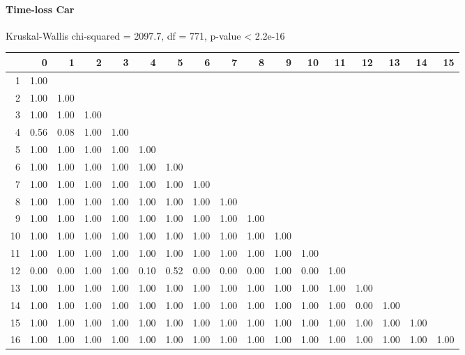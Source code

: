 \paragraph{Time-loss Car}
Kruskal-Wallis chi-squared = 2097.7, df = 771, p-value < 2.2e-16

% 
\begin{tabular}{rrrrrrrrrrrrrrrrr}
  \hline
 & 0 & 1 & 2 & 3 & 4 & 5 & 6 & 7 & 8 & 9 & 10 & 11 & 12 & 13 & 14 & 15 \\ 
  \hline
1 & 1.00 &  &  &  &  &  &  &  &  &  &  &  &  &  &  &  \\ 
  2 & 1.00 & 1.00 &  &  &  &  &  &  &  &  &  &  &  &  &  &  \\ 
  3 & 1.00 & 1.00 & 1.00 &  &  &  &  &  &  &  &  &  &  &  &  &  \\ 
  4 & 0.56 & 0.08 & 1.00 & 1.00 &  &  &  &  &  &  &  &  &  &  &  &  \\ 
  5 & 1.00 & 1.00 & 1.00 & 1.00 & 1.00 &  &  &  &  &  &  &  &  &  &  &  \\ 
  6 & 1.00 & 1.00 & 1.00 & 1.00 & 1.00 & 1.00 &  &  &  &  &  &  &  &  &  &  \\ 
  7 & 1.00 & 1.00 & 1.00 & 1.00 & 1.00 & 1.00 & 1.00 &  &  &  &  &  &  &  &  &  \\ 
  8 & 1.00 & 1.00 & 1.00 & 1.00 & 1.00 & 1.00 & 1.00 & 1.00 &  &  &  &  &  &  &  &  \\ 
  9 & 1.00 & 1.00 & 1.00 & 1.00 & 1.00 & 1.00 & 1.00 & 1.00 & 1.00 &  &  &  &  &  &  &  \\ 
  10 & 1.00 & 1.00 & 1.00 & 1.00 & 1.00 & 1.00 & 1.00 & 1.00 & 1.00 & 1.00 &  &  &  &  &  &  \\ 
  11 & 1.00 & 1.00 & 1.00 & 1.00 & 1.00 & 1.00 & 1.00 & 1.00 & 1.00 & 1.00 & 1.00 &  &  &  &  &  \\ 
  12 & 0.00 & 0.00 & 1.00 & 1.00 & 0.10 & 0.52 & 0.00 & 0.00 & 0.00 & 1.00 & 0.00 & 1.00 &  &  &  &  \\ 
  13 & 1.00 & 1.00 & 1.00 & 1.00 & 1.00 & 1.00 & 1.00 & 1.00 & 1.00 & 1.00 & 1.00 & 1.00 & 1.00 &  &  &  \\ 
  14 & 1.00 & 1.00 & 1.00 & 1.00 & 1.00 & 1.00 & 1.00 & 1.00 & 1.00 & 1.00 & 1.00 & 1.00 & 0.00 & 1.00 &  &  \\ 
  15 & 1.00 & 1.00 & 1.00 & 1.00 & 1.00 & 1.00 & 1.00 & 1.00 & 1.00 & 1.00 & 1.00 & 1.00 & 1.00 & 1.00 & 1.00 &  \\ 
  16 & 1.00 & 1.00 & 1.00 & 1.00 & 1.00 & 1.00 & 1.00 & 1.00 & 1.00 & 1.00 & 1.00 & 1.00 & 1.00 & 1.00 & 1.00 & 1.00 \\ 
   \hline
\end{tabular}
